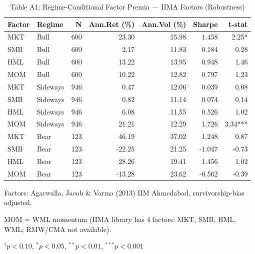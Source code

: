 \begin{table}[h]
\caption{Table A1: Regime-Conditional Factor Premia --- IIMA Factors (Robustness)}
\small
\begin{tabular}{llrrrrr}
\hline
Factor & Regime & N & Ann.Ret (\%) & Ann.Vol (\%) & Sharpe & t-stat \\
\hline
MKT & Bull & 600 & 23.30 & 15.98 & 1.458 & 2.25* \\
SMB & Bull & 600 & 2.17 & 11.83 & 0.184 & 0.28 \\
HML & Bull & 600 & 13.22 & 13.95 & 0.948 & 1.46 \\
MOM & Bull & 600 & 10.22 & 12.82 & 0.797 & 1.23 \\
MKT & Sideways & 946 & 0.47 & 12.06 & 0.039 & 0.08 \\
SMB & Sideways & 946 & 0.82 & 11.14 & 0.074 & 0.14 \\
HML & Sideways & 946 & 6.08 & 11.55 & 0.526 & 1.02 \\
MOM & Sideways & 946 & 21.21 & 12.29 & 1.726 & 3.34*** \\
MKT & Bear & 123 & 46.19 & 37.02 & 1.248 & 0.87 \\
SMB & Bear & 123 & -22.25 & 21.25 & -1.047 & -0.73 \\
HML & Bear & 123 & 28.26 & 19.41 & 1.456 & 1.02 \\
MOM & Bear & 123 & -13.28 & 23.62 & -0.562 & -0.39 \\
\hline
\end{tabular}
\begin{tablenotes}\footnotesize
\item Factors: Agarwalla, Jacob \& Varma (2013) IIM Ahmedabad, survivorship-bias adjusted.
\item MOM = WML momentum (IIMA library has 4 factors: MKT, SMB, HML, WML; RMW/CMA not available).
\item $^\dagger p<0.10$, $^* p<0.05$, $^{**} p<0.01$, $^{***} p<0.001$
\end{tablenotes}
\end{table}